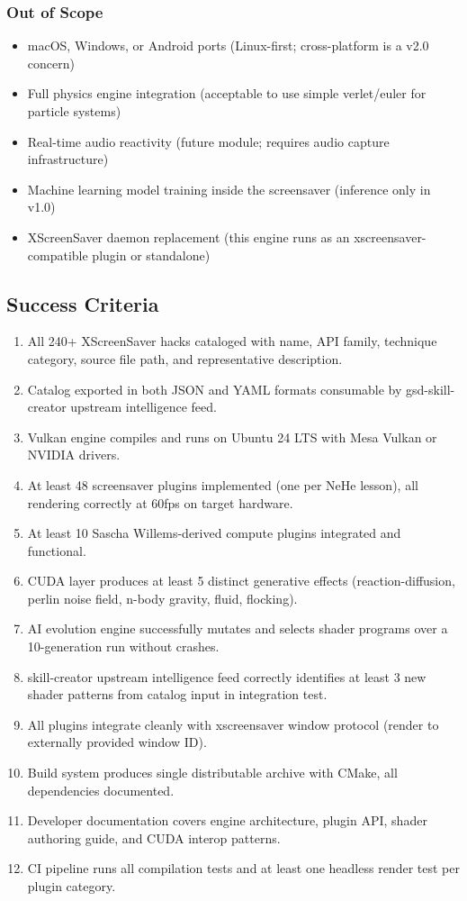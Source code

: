 \documentclass[11pt,letterpaper]{article}
\begin{document}
\subsubsection{Out of Scope}

\begin{itemize}
\item macOS, Windows, or Android ports (Linux-first; cross-platform is a v2.0 concern)
\item Full physics engine integration (acceptable to use simple verlet/euler for particle systems)
\item Real-time audio reactivity (future module; requires audio capture infrastructure)
\item Machine learning model training inside the screensaver (inference only in v1.0)
\item XScreenSaver daemon replacement (this engine runs as an xscreensaver-compatible plugin or standalone)
\end{itemize}

\subsection{Success Criteria}

\begin{enumerate}
\item All 240+ XScreenSaver hacks cataloged with name, API family, technique category, source file path, and representative description.
\item Catalog exported in both JSON and YAML formats consumable by gsd-skill-creator upstream intelligence feed.
\item Vulkan engine compiles and runs on Ubuntu 24 LTS with Mesa Vulkan or NVIDIA drivers.
\item At least 48 screensaver plugins implemented (one per NeHe lesson), all rendering correctly at 60fps on target hardware.
\item At least 10 Sascha Willems-derived compute plugins integrated and functional.
\item CUDA layer produces at least 5 distinct generative effects (reaction-diffusion, perlin noise field, n-body gravity, fluid, flocking).
\item AI evolution engine successfully mutates and selects shader programs over a 10-generation run without crashes.
\item skill-creator upstream intelligence feed correctly identifies at least 3 new shader patterns from catalog input in integration test.
\item All plugins integrate cleanly with xscreensaver window protocol (render to externally provided window ID).
\item Build system produces single distributable archive with CMake, all dependencies documented.
\item Developer documentation covers engine architecture, plugin API, shader authoring guide, and CUDA interop patterns.
\item CI pipeline runs all compilation tests and at least one headless render test per plugin category.
\end{enumerate}
\end{document}
